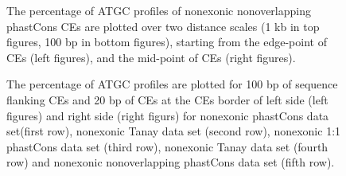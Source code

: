 \documentclass[12pt]{report}
\begin{document}
\begin{figure}[htbp]
\centering
{}
\caption{The percentage of ATGC profiles of nonexonic nonoverlapping phastCons CEs are plotted over two distance scales (1 kb in top figures, 100 bp in bottom figures), starting from the edge-point of CEs (left figures), and the mid-point of CEs (right figures).}
\label{fig:nonoverla_ATGC}
\end{figure}

\begin{figure}[htbp]
\centering
{}
\caption{The percentage of ATGC profiles are plotted for 100 bp of sequence flanking CEs and 20 bp of CEs at the CEs border of left side (left figures) and  right side (right figurs) for nonexonic phastCons data set(first row), nonexonic Tanay data set (second row), nonexonic 1:1 phastCons data set (third row), nonexonic Tanay data set (fourth row) and nonexonic nonoverlapping phastCons data set (fifth row).}
\label{fig:aligned_all}
\end{figure}

\newpage 


\end{document}
